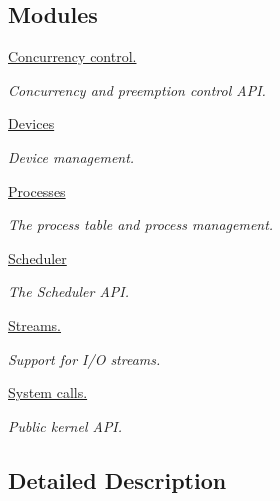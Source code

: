 \subsection*{Modules}
\begin{DoxyCompactItemize}
\item 
\hyperlink{group__cc}{Concurrency control.}
\begin{DoxyCompactList}\small\item\em Concurrency and preemption control A\-P\-I. \end{DoxyCompactList}\item 
\hyperlink{group__dev}{Devices}
\begin{DoxyCompactList}\small\item\em Device management. \end{DoxyCompactList}\item 
\hyperlink{group__proc}{Processes}
\begin{DoxyCompactList}\small\item\em The process table and process management. \end{DoxyCompactList}\item 
\hyperlink{group__scheduler}{Scheduler}
\begin{DoxyCompactList}\small\item\em The Scheduler A\-P\-I. \end{DoxyCompactList}\item 
\hyperlink{group__streams}{Streams.}
\begin{DoxyCompactList}\small\item\em Support for I/\-O streams. \end{DoxyCompactList}\item 
\hyperlink{group__syscalls}{System calls.}
\begin{DoxyCompactList}\small\item\em Public kernel A\-P\-I. \end{DoxyCompactList}\end{DoxyCompactItemize}


\subsection{Detailed Description}
